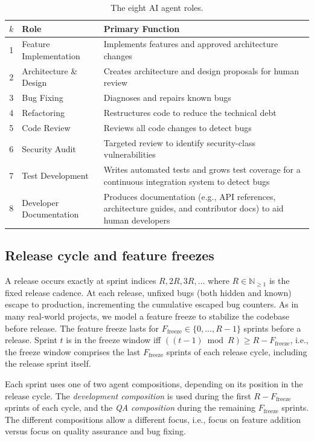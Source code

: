 \documentclass[smallextended]{svjour3}       %
\begin{document}
\begin{table}[t]
\caption{The eight AI agent roles.}
\label{tab:roles}
\footnotesize
\begin{tabularx}{\linewidth}{cp{2.6cm}X}
\toprule
$k$ & Role & Primary Function \\
\midrule
1 & Feature Implementation
  & Implements features and approved architecture changes \\[2pt]
2 & Architecture \& Design
  & Creates architecture and design proposals for human review \\[2pt]
3 & Bug Fixing
  & Diagnoses and repairs known bugs \\[2pt]
4 & Refactoring
  & Restructures code to reduce the technical debt \\[2pt]
5 & Code Review
  & Reviews all code changes to detect bugs \\[2pt]
6 & Security Audit
  & Targeted review to identify security-class vulnerabilities \\[2pt]
7 & Test Development
  & Writes automated tests and grows test coverage for a continuous integration system to detect bugs \\[2pt]
8 & Developer Documentation
  & Produces documentation (e.g., API references, architecture guides, and contributor docs) to aid human developers \\
\bottomrule
\end{tabularx}
\end{table}

\subsection{Release cycle and feature freezes}
\label{sec:model:cycle}

A release occurs exactly at sprint indices $R, 2R, 3R, \ldots$ where $R \in \mathbb{N}_{\geq 1}$
is the fixed release cadence. At each release, unfixed bugs (both hidden and known)
escape to production, incrementing the cumulative escaped bug counters. 
As in many real-world projects, we model a feature freeze to stabilize the
codebase before release. The feature freeze lasts for $F_\mathrm{freeze} \in
\{0, \ldots, R-1\}$ sprints before a release.
Sprint $t$ is in the freeze window iff $((t-1) \bmod R) \geq R - F_\mathrm{freeze}$, i.e., the freeze window comprises the last $F_\mathrm{freeze}$ sprints of each release cycle, including the release sprint itself.

Each sprint uses one of two agent compositions, depending on its position in the release cycle. The \emph{development composition} is used during the first $R - F_\mathrm{freeze}$ sprints of each cycle, and the \emph{QA composition} during the remaining $F_\mathrm{freeze}$ sprints. The different compositions allow a different focus,
i.e., focus on feature addition versus focus on quality assurance and bug fixing.
\end{document}
